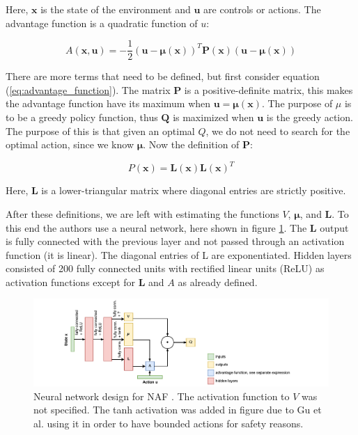 Here, $\mathbf{x}$ is the state of the environment and $\mathbf{u}$ are
controls or actions. The advantage function is a quadratic function of $u$:

\begin{equation}
    A(\mathbf{x}, \mathbf{u}) = -\frac{1}{2}(\mathbf{u} - \mathbf{\mu(x)})^T\mathbf{P(x)}(\mathbf{u} - \mathbf{\mu(x)})
    \label{eq:advantage_function}
\end{equation}

There are more terms that need to be defined, but first consider equation
(\ref{eq:advantage_function}). The matrix $\mathbf{P}$ is a positive-definite
matrix, this makes the advantage function have its maximum when $\mathbf{u =
\mu(x)}$.  The purpose of $\mu$ is to be a greedy policy function, thus
$\mathbf{Q}$ is maximized when $\mathbf{u}$ is the greedy action. The purpose
of this is that given an optimal $Q$, we do not need to search for the optimal
action, since we know $\mathbf{\mu}$. Now the definition of $\mathbf{P}$:

\begin{equation}
    P(\mathbf{x}) = \mathbf{L(x)L(x)}^T
\end{equation}

Here, $\mathbf{L}$ is a lower-triangular matrix where diagonal entries are
strictly positive.

After these definitions, we are left with estimating the functions $V$,
$\mathbf{\mu}$, and $\mathbf{L}$. To this end the authors use a neural network,
here shown in figure \ref{fig:naf-net}. The $\mathbf{L}$ output is fully
connected with the previous layer and not passed through an activation function
(it is linear). The diagonal entries of L are exponentiated. Hidden layers
consisted of 200 fully connected units with rectified linear units (ReLU) as
activation functions except for $\mathbf{L}$ and $A$ as already defined.

\begin{figure}[h]
    \centering
    \includegraphics[width=1.0\textwidth]{res/naf-net.pdf}

    \caption{Neural network design for NAF \cite{gu2016continuous}. The
    activation function to $V$ was not specified. The tanh activation was added
    in figure due to Gu et al. \cite{gu2016deep} using it in order to have
    bounded actions for safety reasons.}

    \label{fig:naf-net}
\end{figure}

